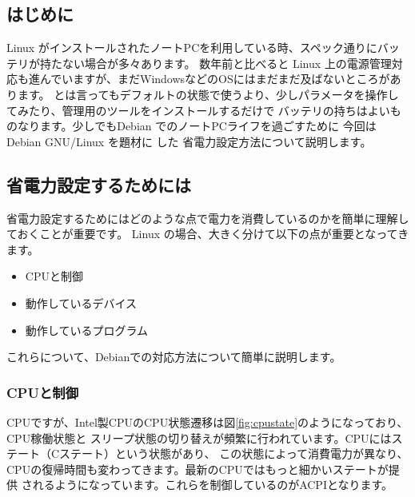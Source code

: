 \documentclass[mingoth,a4paper]{jsarticle}
\begin{document}


\subsection{はじめに}

Linux がインストールされたノートPCを利用している時、スペック通りにバッテリが持たない場合が多々あります。
数年前と比べると Linux 上の電源管理対応も進んでいますが、まだWindowsなどのOSにはまだまだ及ばないところがあります。
とは言ってもデフォルトの状態で使うより、少しパラメータを操作してみたり、管理用のツールをインストールするだけで
バッテリの持ちはよいものなります。少しでもDebian でのノートPCライフを過ごすために 今回は Debian GNU/Linux を題材に
した 省電力設定方法について説明します。


\subsection{省電力設定するためには}

省電力設定するためにはどのような点で電力を消費しているのかを簡単に理解しておくことが重要です。
Linux の場合、大きく分けて以下の点が重要となってきます。

\begin{itemize}
\item CPUと制御
\item 動作しているデバイス
\item 動作しているプログラム
\end{itemize}

これらについて、Debianでの対応方法について簡単に説明します。

\subsubsection{CPUと制御}

CPUですが、Intel製CPUのCPU状態遷移は図\ref{fig:cpustate}のようになっており、CPU稼働状態と
スリープ状態の切り替えが頻繁に行われています。CPUにはステート（Cステート）という状態があり、
この状態によって消費電力が異なり、CPUの復帰時間も変わってきます。最新のCPUではもっと細かいステートが提供
されるようになっています。これらを制御しているのがACPIとなります。
\end{document}
